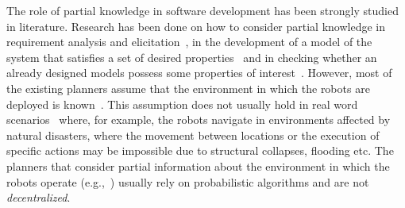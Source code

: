 The role of partial knowledge in software development has been strongly studied in literature.
Research has been done on how to consider partial knowledge in requirement analysis and elicitation~\cite{menghi2017integrating,menghi2017cover,letier2008deriving}, in the development of a model of the system that satisfies a set of desired properties~\cite{uchitel2009synthesis,uchitel2013supporting,famelis2012partial,albarghouthi2012under,Bernasconi2017} and in checking   whether an  already designed models possess some properties of interest~\cite{menghi2016dealing,bruns1999model,chechik2004multi}.
However, most of the existing planners assume that the environment in which the robots are deployed is known~\cite{7139412}. 
This assumption does not usually hold in real word scenarios~\cite{lahijanian2016iterative}  where, for example,  the robots navigate in environments affected by natural disasters, where the movement between locations or the execution of specific actions may be impossible due to structural collapses, flooding etc.
The planners that consider  partial information about the environment in which the robots operate (e.g.,~\cite{roy2006planning,du2012robot,diaz2001exploring}) usually rely on probabilistic algorithms and are not  \emph{decentralized}.




